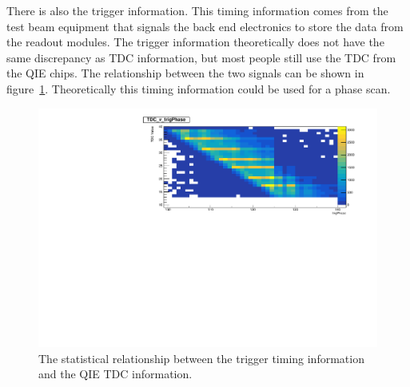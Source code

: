 There is also the trigger information. This timing information comes from the test beam equipment that signals the back end electronics to store the data from the readout modules. The trigger information theoretically does not have the same discrepancy as TDC information, but most people still use the TDC from the QIE chips. The relationship between the two signals can be shown in figure~\ref{fig:tdc}. Theoretically this timing information could be used for a phase scan.

\begin{figure}
\centering
\includegraphics[width=\linewidth]{Figures/TDCvTrigPhase.pdf}
\caption{The statistical relationship between the trigger timing information and the QIE TDC information.}
\label{fig:tdc}
\end{figure}

